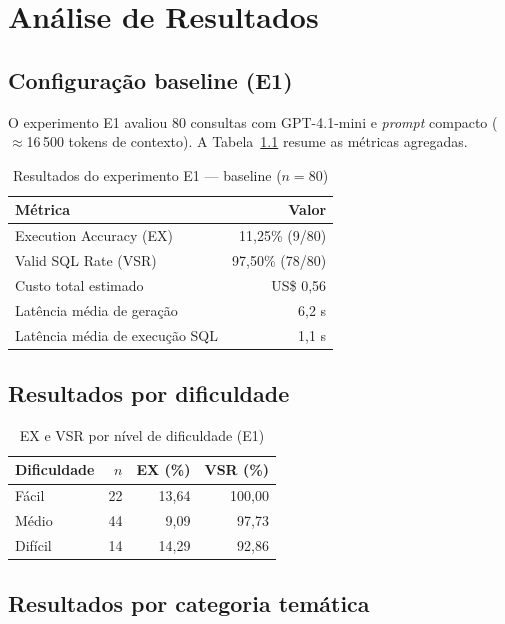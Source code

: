 \chapter{Análise de Resultados}

\section{Configuração baseline (E1)}

O experimento E1 avaliou 80 consultas com GPT-4.1-mini e \textit{prompt} compacto ($\approx$16\,500 tokens de contexto). A Tabela~\ref{tab:baseline} resume as métricas agregadas.

\begin{table}[htbp]
\centering
\caption{Resultados do experimento E1 --- baseline ($n=80$)}
\label{tab:baseline}
\begin{tabular}{lr}
\toprule
\textbf{Métrica} & \textbf{Valor} \\
\midrule
Execution Accuracy (EX) & 11,25\% (9/80) \\
Valid SQL Rate (VSR) & 97,50\% (78/80) \\
Custo total estimado & US\$ 0,56 \\
Latência média de geração & 6,2 s \\
Latência média de execução SQL & 1,1 s \\
\bottomrule
\end{tabular}
\end{table}

\section{Resultados por dificuldade}

\begin{table}[htbp]
\centering
\caption{EX e VSR por nível de dificuldade (E1)}
\label{tab:diff}
\begin{tabular}{lrrr}
\toprule
\textbf{Dificuldade} & \textbf{$n$} & \textbf{EX (\%)} & \textbf{VSR (\%)} \\
\midrule
Fácil & 22 & 13,64 & 100,00 \\
Médio & 44 & 9,09 & 97,73 \\
Difícil & 14 & 14,29 & 92,86 \\
\bottomrule
\end{tabular}
\end{table}

\section{Resultados por categoria temática}

